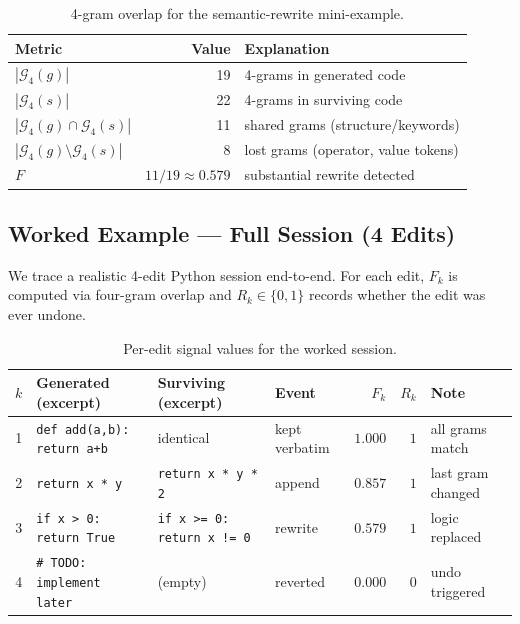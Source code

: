 \documentclass[11pt,a4paper]{article}
\begin{document}
\begin{table}[h!]
\centering
\caption{4-gram overlap for the semantic-rewrite mini-example.}
\label{tab:4gram-rewrite}
\begin{tabular}{@{}lrl@{}}
\toprule
Metric & Value & Explanation \\
\midrule
$|\mathcal{G}_4(g)|$ & 19 & 4-grams in generated code \\
$|\mathcal{G}_4(s)|$ & 22 & 4-grams in surviving code \\
$|\mathcal{G}_4(g) \cap \mathcal{G}_4(s)|$ & 11 & shared grams (structure/keywords) \\
$|\mathcal{G}_4(g) \setminus \mathcal{G}_4(s)|$ & 8 & lost grams (operator, value tokens) \\
$F$ & $11/19 \approx 0.579$ & substantial rewrite detected \\
\bottomrule
\end{tabular}
\end{table}

\subsection{Worked Example --- Full Session (4 Edits)}
\label{sec:edit-survival-example}

We trace a realistic 4-edit Python session end-to-end.  For each edit,
$F_k$ is computed via four-gram overlap and $R_k \in \{0,1\}$ records
whether the edit was ever undone.

\begin{table}[h!]
\centering
\caption{Per-edit signal values for the worked session.}
\label{tab:edit-per-edit}
\begin{tabular}{@{}clllrrl@{}}
\toprule
$k$ & Generated (excerpt) & Surviving (excerpt) & Event & $F_k$ & $R_k$ & Note \\
\midrule
1 & \texttt{def add(a,b): return a+b} & identical & kept verbatim
    & $1.000$ & $1$ & all grams match \\
2 & \texttt{return x * y} & \texttt{return x * y * 2}
    & append & $0.857$ & $1$ & last gram changed \\
3 & \texttt{if x > 0: return True} & \texttt{if x >= 0: return x != 0}
    & rewrite & $0.579$ & $1$ & logic replaced \\
4 & \texttt{\# TODO: implement later} & (empty) & reverted
    & $0.000$ & $0$ & undo triggered \\
\bottomrule
\end{tabular}
\end{table}
\end{document}
